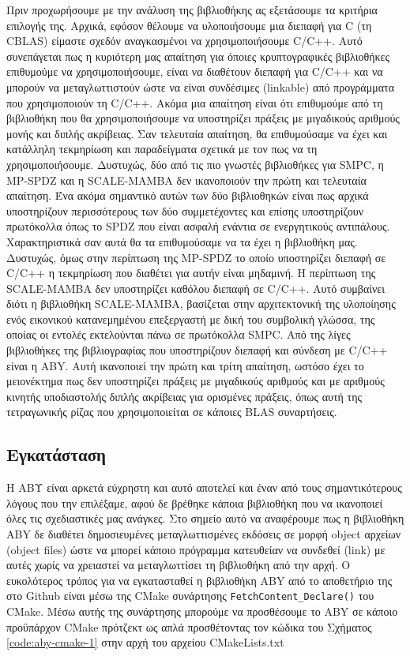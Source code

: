 Πριν προχωρήσουμε με την ανάλυση της βιβλιοθήκης ας εξετάσουμε τα κριτήρια επιλογής της. Αρχικά, εφόσον θέλουμε να υλοποιήσουμε μια διεπαφή για C (τη CBLAS) είμαστε σχεδόν αναγκασμένοι να χρησιμοποιήσουμε C/C++. Αυτό συνεπάγεται πως η κυριότερη μας απαίτηση για όποιες κρυπτογραφικές βιβλιοθήκες επιθυμούμε να χρησιμοποιήσουμε, είναι να διαθέτουν διεπαφή για C/C++ και να μπορούν να μεταγλωττιστούν ώστε να είναι συνδέσιμες (linkable) από προγράμματα που χρησιμοποιούν τη C/C++. Ακόμα μια απαίτηση είναι ότι επιθυμούμε από τη βιβλιοθήκη που θα χρησιμοποιήσουμε να υποστηρίζει πράξεις με μιγαδικούς αριθμούς μονής και διπλής ακρίβειας. Σαν τελευταία απαίτηση, θα επιθυμούσαμε να έχει και κατάλληλη τεκμηρίωση και παραδείγματα σχετικά με τον πως να τη χρησιμοποιήσουμε. Δυστυχώς, δύο από τις πιο γνωστές βιβλιοθήκες για SMPC, η MP-SPDZ και η SCALE-MAMBA δεν ικανοποιούν την πρώτη και τελευταία απαίτηση. Ένα ακόμα σημαντικό αυτών των δύο βιβλιοθηκών είναι πως αρχικά υποστηρίζουν περισσότερους των δύο συμμετέχοντες και επίσης υποστηρίζουν πρωτόκολλα όπως το SPDZ που είναι ασφαλή ενάντια σε ενεργητικούς αντιπάλους. Χαρακτηριστικά σαν αυτά θα τα επιθυμούσαμε να τα έχει η βιβλιοθήκη μας. Δυστυχώς, όμως στην περίπτωση της MP-SPDZ το οποίο υποστηρίζει διεπαφή σε C/C++ η τεκμηρίωση που διαθέτει για αυτήν είναι μηδαμινή. Η περίπτωση της SCALE-MAMBA δεν υποστηρίζει καθόλου διεπαφή σε C/C++. Αυτό συμβαίνει διότι η βιβλιοθήκη SCALE-MAMBA, βασίζεται στην αρχιτεκτονική της υλοποίησης ενός εικονικού κατανεμημένου επεξεργαστή με δική του συμβολική γλώσσα, της οποίας οι εντολές εκτελούνται πάνω σε πρωτόκολλα SMPC. Από της λίγες βιβλιοθήκες της βιβλιογραφίας που υποστηρίζουν διεπαφή και σύνδεση με C/C++ είναι η ABY. Αυτή ικανοποιεί την πρώτη και τρίτη απαίτηση, ωστόσο έχει το μειονέκτημα πως δεν υποστηρίζει πράξεις με μιγαδικούς αριθμούς και με αριθμούς κινητής υποδιαστολής διπλής ακρίβειας για ορισμένες πράξεις, όπως αυτή της τετραγωνικής ρίζας που χρησιμοποιείται σε κάποιες BLAS συναρτήσεις.

\subsection{Εγκατάσταση}

H ΑΒΥ είναι αρκετά εύχρηστη και αυτό αποτελεί και έναν από τους σημαντικότερους λόγους που την επιλέξαμε, αφού δε βρέθηκε κάποια βιβλιοθήκη που να ικανοποιεί όλες τις σχεδιαστικές μας ανάγκες. Στο σημείο αυτό να αναφέρουμε πως η βιβλιοθήκη ABY δε διαθέτει δημοσιευμένες μεταγλωττισμένες εκδόσεις σε μορφή object αρχείων (object files) ώστε να μπορεί κάποιο πρόγραμμα κατευθείαν να συνδεθεί (link) με αυτές χωρίς να χρειαστεί να μεταγλωττίσει τη βιβλιοθήκη από την αρχή. Ο ευκολότερος τρόπος για να εγκατασταθεί η βιβλιοθήκη ABY από το αποθετήριο της στο Github είναι μέσω της CMake συνάρτησης \texttt{FetchContent_Declare()} του CMake. Μέσω αυτής της συνάρτησης μπορούμε να προσθέσουμε το ABY σε κάποιο προϋπάρχον CMake πρότζεκτ ως απλά προσθέτοντας τον κώδικα του Σχήματος \ref{code:aby-cmake-1} στην αρχή του αρχείου CMakeLists.txt

